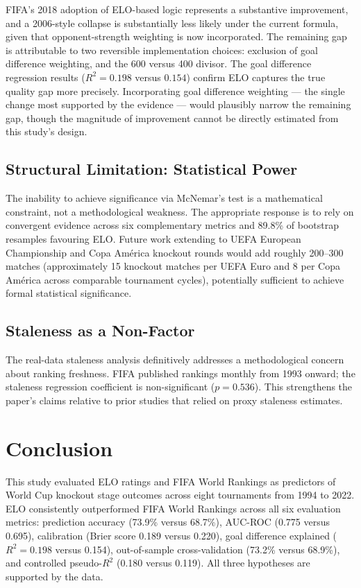 \documentclass[12pt, a4paper]{article}
\begin{document}
FIFA's 2018 adoption of ELO-based logic represents a substantive improvement, and a 2006-style
collapse is substantially less likely under the current formula, given that opponent-strength weighting is now incorporated. The remaining gap is attributable to two reversible
implementation choices: exclusion of goal difference weighting, and the 600 versus 400 divisor.
The goal difference regression results ($R^{2} = 0.198$ versus $0.154$) confirm ELO captures
the true quality gap more precisely. Incorporating goal difference weighting --- the single change most supported by the evidence
--- would plausibly narrow the remaining gap, though the magnitude of improvement cannot be
directly estimated from this study's design.

\subsection{Structural Limitation: Statistical Power}

The inability to achieve significance via McNemar's test is a mathematical constraint, not a
methodological weakness. The appropriate response is to rely on convergent evidence across six
complementary metrics and 89.8\% of bootstrap resamples favouring ELO. Future work extending to
UEFA European Championship and Copa Am\'erica knockout rounds would add roughly 200--300 matches
(approximately 15 knockout matches per UEFA Euro and 8 per Copa Am\'erica across comparable
tournament cycles), potentially sufficient to achieve formal statistical significance.

\subsection{Staleness as a Non-Factor}

The real-data staleness analysis definitively addresses a methodological concern about ranking
freshness. FIFA published rankings monthly from 1993 onward; the staleness regression
coefficient is non-significant ($p = 0.536$). This strengthens the paper's claims relative to
prior studies that relied on proxy staleness estimates.

\section{Conclusion}

This study evaluated ELO ratings and FIFA World Rankings as predictors of World Cup knockout
stage outcomes across eight tournaments from 1994 to 2022. ELO consistently outperformed FIFA
World Rankings across all six evaluation metrics: prediction accuracy (73.9\% versus 68.7\%),
AUC-ROC (0.775 versus 0.695), calibration (Brier score 0.189 versus 0.220), goal difference
explained ($R^{2} = 0.198$ versus 0.154), out-of-sample cross-validation (73.2\% versus 68.9\%),
and controlled pseudo-$R^{2}$ (0.180 versus 0.119). All three hypotheses are supported by
the data.
\end{document}

